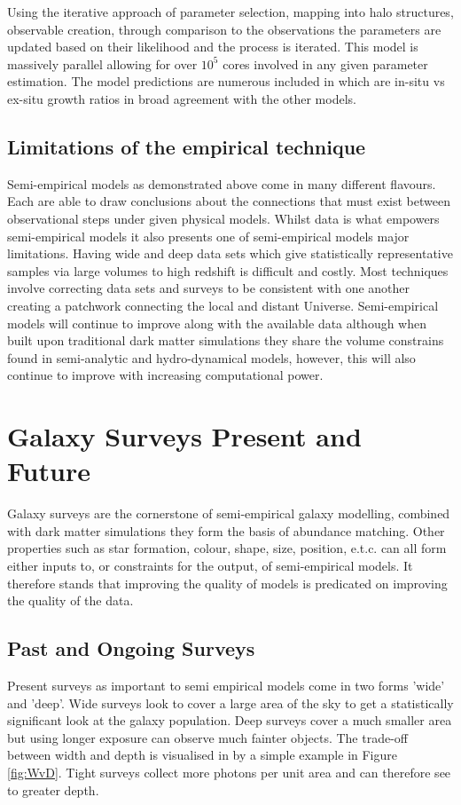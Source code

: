Using the iterative approach of parameter selection, mapping into halo structures, observable creation, through comparison to the observations the parameters are updated based on their likelihood and the process is iterated. This model is massively parallel allowing for over $10^{5}$ cores involved in any given parameter estimation. The model predictions are numerous included in which are in-situ vs ex-situ growth ratios in broad agreement with the other models.

\subsection{Limitations of the empirical technique}
Semi-empirical models as demonstrated above come in many different flavours. Each are able to draw conclusions about the connections that must exist between observational steps under given physical models. Whilst data is what empowers semi-empirical models it also presents one of semi-empirical models major limitations. Having wide and deep data sets which give statistically representative samples via large volumes to high redshift is difficult and costly. Most techniques involve correcting data sets and surveys to be consistent with one another creating a patchwork connecting the local and distant Universe. Semi-empirical models will continue to improve along with the available data although when built upon traditional dark matter simulations they share the volume constrains found in semi-analytic and hydro-dynamical models, however, this will also continue to improve with increasing computational power.


\section{Galaxy Surveys Present and Future}
\label{sec:Surveys}
Galaxy surveys are the cornerstone of semi-empirical galaxy modelling, combined with dark matter simulations they form the basis of abundance matching. Other properties such as star formation, colour, shape, size, position, e.t.c. can all form either inputs to, or constraints for the output, of semi-empirical models. It therefore stands that improving the quality of models is predicated on improving the quality of the data.

\subsection{Past and Ongoing Surveys}
Present surveys as important to semi empirical models come in two forms 'wide' and 'deep'. Wide surveys look to cover a large area of the sky to get a statistically significant look at the galaxy population. Deep surveys cover a much smaller area but using longer exposure can observe much fainter objects. The trade-off between width and depth is visualised in by a simple example in Figure \ref{fig:WvD}. Tight surveys collect more photons per unit area and can therefore see to greater depth.

